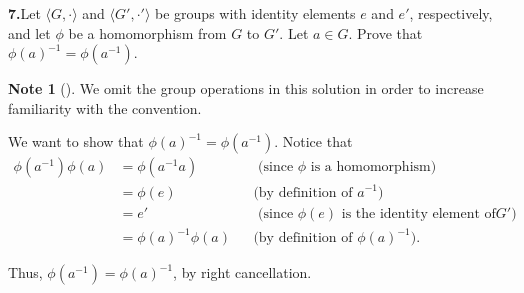 \documentclass[10pt,]{book}
\theoremstyle{plain}
\theoremstyle{definition}
\theoremstyle{definition}
\newtheorem{note}[theorem]{Note}
\theoremstyle{definition}
\theoremstyle{definition}
\numberwithin{equation}{section}
\newcommand{\amp}{&}
\begin{document}
\par\smallskip
\noindent\textbf{7.}\quad{}Let \(\langle G,\cdot\rangle\) and \(\langle G',\cdot'\rangle\) be groups with identity elements \(e\) and \(e'\), respectively, and let \(\phi\) be a homomorphism from \(G\) to \(G'\). Let \(a\in G\). Prove that \(\phi(a)^{-1}=\phi(a^{-1})\).%
\par\smallskip
\begin{note}[]\label{note-7}
We omit the group operations in this solution in order to increase familiarity with the convention.%
\end{note}
We want to show that \(\phi(a)^{-1}=\phi(a^{-1})\). Notice that%
\begin{align*}
\phi(a^{-1})\phi(a)\amp =\phi(a^{-1}a)\amp \amp \text{ (since \(\phi\) is a homomorphism) }\\
\amp =\phi(e)\amp \amp \text{(by definition of \(a^{-1}\))}\\
\amp =e'\amp \amp  \text{ (since \(\phi(e)\) is the identity element of
\(G'\)) }\\
\amp =\phi(a)^{-1}\phi(a)\amp \amp \text{(by definition of \(\phi(a)^{-1}\))} .
\end{align*}
%
\par
Thus, \(\phi(a^{-1})=\phi(a)^{-1}\), by right cancellation.%
\par\smallskip
\end{document}
